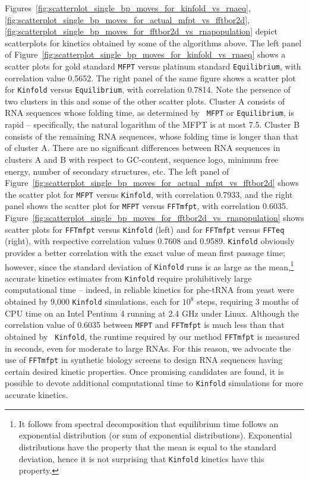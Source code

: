 Figures~\ref{fig:scatterplot_single_bp_moves_for_kinfold_vs_rnaeq},
\ref{fig:scatterplot_single_bp_moves_for_actual_mfpt_vs_fftbor2d},
\ref{fig:scatterplot_single_bp_moves_for_fftbor2d_vs_rnapopulation}
depict scatterplots for kinetics obtained by some of the algorithms
above. The left panel of
Figure~\ref{fig:scatterplot_single_bp_moves_for_kinfold_vs_rnaeq}
shows a scatter plots for gold standard {\tt MFPT} versus platinum
standard {\tt Equilibrium}, with correlation value 0.5652. The right
panel of the same figure shows a scatter plot for {\tt Kinfold} versus
{\tt Equilibrium}, with correlation 0.7814. Note the persence of two
clusters in this and some of the other scatter plots. Cluster A
consists of RNA sequences whose folding time, as determined by {\tt
MFPT} or {\tt Equilibrium}, is rapid -- specifically, the natural
logarithm of the MFPT is at most 7.5. Cluster B consists of the
remaining RNA sequences, whose folding time is longer than that of
cluster A. There are no significant differences between RNA sequences
in clusters A and B with respect to GC-content, sequence logo, minimum
free energy, number of secondary structures, etc.  The left panel of
Figure~\ref{fig:scatterplot_single_bp_moves_for_actual_mfpt_vs_fftbor2d}
shows the scatter plot for {\tt MFPT} versus {\tt Kinfold}, with
correlation 0.7933, and the right panel shows the scatter plot for
{\tt MFPT} versus {\tt FFTmfpt}, with correlation 0.6035.
Figure~\ref{fig:scatterplot_single_bp_moves_for_fftbor2d_vs_rnapopulation}
shows scatter plots for {\tt FFTmfpt} versus {\tt Kinfold} (left) and
for {\tt FFTmfpt} versus {\tt FFTeq} (right), with respective
correlation values 0.7608 and 0.9589. {\tt Kinfold} obviously provides
a better correlation with the exact value of mean first passage time;
however, since the standard deviation of {\tt Kinfold} runs is as
large as the mean,\footnote{It follows from spectral decomposition that
equilibrium time follows an exponential distribution (or sum of
exponential distributions). Exponential distributions have the property
that the mean is equal to the standard deviation, hence
it is not surprising that {\tt Kinfold}
kinetics have this property.} accurate kinetics estimates
from {\tt Kinfold} require prohibitively large computational time -- indeed, in
\cite{wolfingerStadler:kinetics} reliable kinetics for phe-tRNA from
yeast were obtained by 9,000 {\tt Kinfold} simulations, each for $10^8$
steps, requiring 3 months of CPU time on an Intel Pentium 4 running at
2.4 GHz under Linux. Although the correlation value of 0.6035 between
{\tt MFPT} and {\tt FFTmfpt} is much less than that obtained by {\tt
Kinfold}, the runtime required by our method {\tt FFTmfpt} is measured
in seconds, even for moderate to large RNAs. For this reason, we
advocate the use of {\tt FFTmfpt} in synthetic biology screens to
design RNA sequences having certain desired kinetic properties. Once
promising candidates are found, it is possible to devote additional
computational time to {\tt Kinfold} simulations for more accurate
kinetics.


